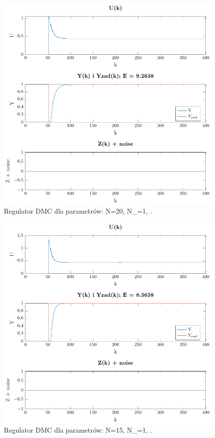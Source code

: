 \documentclass[a4paper,titlepage,11pt,twosides,floatssmall]{mwrep}
\begin{document}
\begin{figure}[H]
	\centering
	\includegraphics[scale=0.85]{../../Lab2/PDF_rysunki/Z4_DMCParametryN_20_Nu_1_lam_1.pdf}
	\caption{Regulator DMC dla parametrów: N=20, N_{}=1, .}
	\label{dobor_param3}
\end{figure}



\begin{figure}[H]
	\centering
	\includegraphics[scale=0.85]{../../Lab2/PDF_rysunki/Z4_DMCParametryN_15_Nu_1_lam_1.pdf}
	\caption{Regulator DMC dla parametrów: N=15, N_{}=1, .}
	\label{dobor_param2}
\end{figure}
\end{document}
